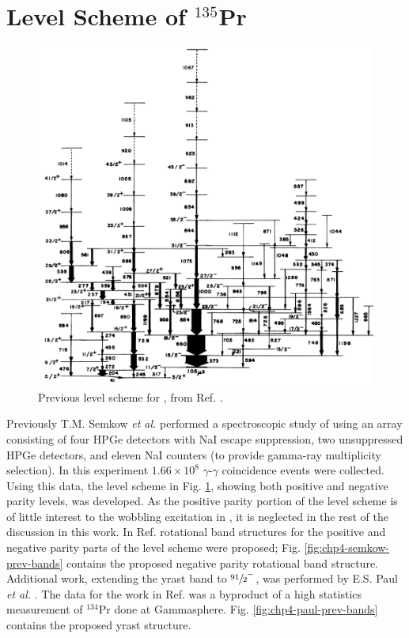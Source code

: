 \section{Level Scheme of $^{135}$Pr}
\label{sec:trw-lvl-scheme}
\begin{figure}[b!]
\centerline{\includegraphics[height=0.5\textheight]{./img/c4/old_scheme.png}}
	\caption{Previous level scheme for \pr{}, from Ref. \cite{semkow135Pr}. \label{fig:chp4-semkow-lvl-schm}}
\end{figure}
Previously T.M. Semkow \emph{et al.} performed a spectroscopic study of \pr{} \cite{semkow135Pr} using an array consisting of four HPGe detectors with NaI escape suppression, two unsuppressed HPGe detectors, and eleven NaI counters (to provide gamma-ray multiplicity selection). In this experiment $1.66\times{}10^8$ $\gamma{}$-$\gamma{}$ coincidence events were collected. Using this data, the level scheme in Fig. \ref{fig:chp4-semkow-lvl-schm}, showing both positive and negative parity levels, was developed. As the positive parity portion of the level scheme is of little interest to the wobbling excitation in \pr{}, it is neglected in the rest of the discussion in this work. In Ref. \cite{semkow135Pr} rotational band structures for the positive and negative parity parts of the level scheme were proposed; Fig. \ref{fig:chp4-semkow-prev-bands} contains the proposed negative parity rotational band structure. Additional work, extending the yrast band to $\sfrac{91}{2}^-$, was performed by E.S. Paul \emph{et al.} \cite{ePaul135Pr}. The data for the work in Ref. \cite{ePaul135Pr} was a byproduct of a high statistics measurement of $^{134}$Pr done at Gammasphere. Fig. \ref{fig:chp4-paul-prev-bands} contains the proposed yrast structure.
